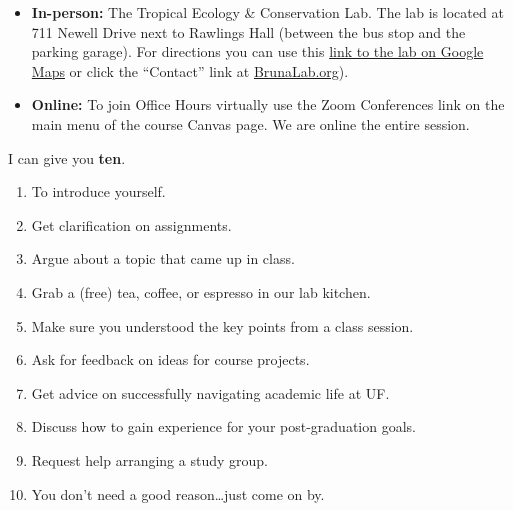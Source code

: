 \documentclass[
  10pt,
  letterpaper,
  oneside,
  open=any]{scrbook}
\providecommand{\tightlist}{%
  \setlength{\itemsep}{0pt}\setlength{\parskip}{0pt}}\usepackage{longtable,booktabs,array}
\begin{document}
\begin{itemize}
\item
  \textbf{In-person:} The Tropical Ecology \& Conservation Lab. The lab
  is located at 711 Newell Drive next to Rawlings Hall (between the bus
  stop and the parking garage). For directions you can use this
  \href{https://maps.app.goo.gl/xo13vJmj8WXAivpZ9}{link to the lab on
  Google Maps} or click the ``Contact'' link at
  \href{http://brunalab.org}{BrunaLab.org}).
\item
  \textbf{Online:} To join Office Hours virtually use the Zoom
  Conferences link on the main menu of the course Canvas page. We are
  online the entire session.
\end{itemize}

\begin{tcolorbox}[enhanced jigsaw, arc=.35mm, coltitle=black, left=2mm, colback=white, breakable, rightrule=.15mm, bottomrule=.15mm, opacitybacktitle=0.6, opacityback=0, colbacktitle=quarto-callout-tip-color!10!white, bottomtitle=1mm, toptitle=1mm, colframe=quarto-callout-tip-color-frame, titlerule=0mm, toprule=.15mm, title=\textcolor{quarto-callout-tip-color}{\faLightbulb}\hspace{0.5em}{Can you give me \textbf{one good reason} why I should go to Office
Hours?}, leftrule=.75mm]

I can give you \textbf{ten}.

\begin{enumerate}
\def\labelenumi{\arabic{enumi}.}
\tightlist
\item
  To introduce yourself.
\item
  Get clarification on assignments.
\item
  Argue about a topic that came up in class.
\item
  Grab a (free) tea, coffee, or espresso in our lab kitchen.
\item
  Make sure you understood the key points from a class session.
\item
  Ask for feedback on ideas for course projects.
\item
  Get advice on successfully navigating academic life at UF.
\item
  Discuss how to gain experience for your post-graduation goals.
\item
  Request help arranging a study group.
\item
  You don't need a good reason\ldots just come on by.
\end{enumerate}

\end{tcolorbox}
\end{document}
